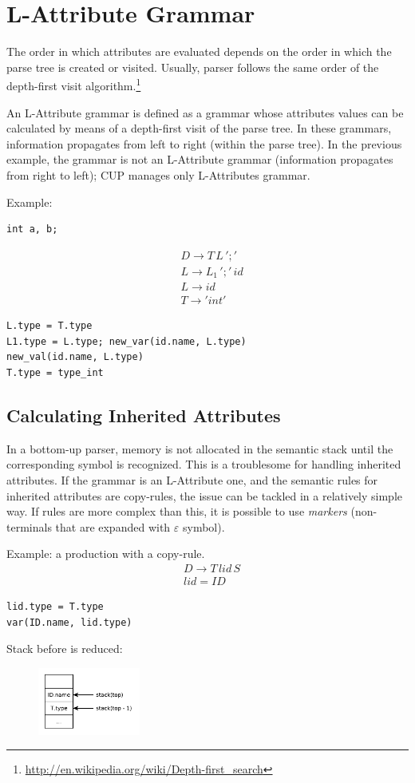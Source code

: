\section{L-Attribute Grammar}
The order in which attributes are evaluated depends on the order in which the parse tree is created or visited.
Usually, parser follows the same order of the depth-first visit algorithm.\footnote{\url{http://en.wikipedia.org/wiki/Depth-first_search}}

An L-Attribute grammar is defined as a grammar whose attributes values can be calculated by means of a depth-first visit of the parse tree.
In these grammars, information propagates from left to right (within the parse tree).
In the previous example, the grammar is not an L-Attribute grammar (information propagates from right to left); CUP manages only L-Attributes grammar.

Example:
\begin{lstlisting}
int a, b;
\end{lstlisting}
\begin{align*}
& D \to T \, L \, ';' \\
& L \to L_1 \, ';' \, id \\
& L \to id \\
& T \to 'int'
\end{align*}
\begin{lstlisting}
L.type = T.type
L1.type = L.type; new_var(id.name, L.type)
new_val(id.name, L.type)
T.type = type_int
\end{lstlisting}

\subsection{Calculating Inherited Attributes}
In a bottom-up parser, memory is not allocated in the semantic stack until the corresponding symbol is recognized.
This is a troublesome for handling inherited attributes.
If the grammar is an L-Attribute one, and the semantic rules for inherited attributes are copy-rules, the issue can be tackled in a relatively simple way.
If rules are more complex than this, it is possible to use \emph{markers} (non-terminals that are expanded with $\varepsilon$ symbol).

Example: a production with a copy-rule.
\begin{align*}
& D \to T \, lid \, S \\
& lid = ID
\end{align*}
\begin{lstlisting}
lid.type = T.type
var(ID.name, lid.type)
\end{lstlisting}
Stack before  is reduced:
\begin{figure}[H]
    \centerline{\includegraphics[width=0.3\textwidth]{img/33.pdf}}
\end{figure}

